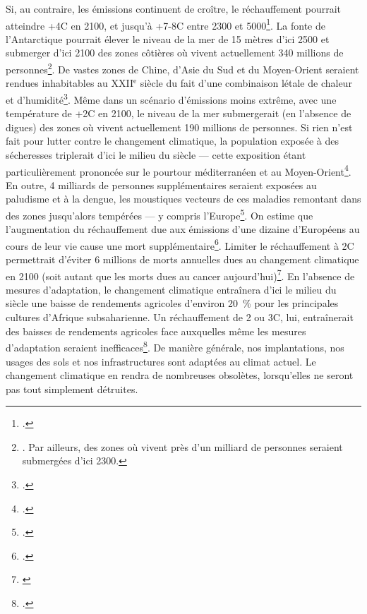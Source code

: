 \documentclass[a5paper,french,openany]{memoir}
\begin{document}
Si, au contraire, les émissions continuent de croître, le réchauffement pourrait atteindre +4\textdegree{}C en 2100, et jusqu'à +7-8\textdegree{}C entre 2300 et 5000\footnote{\citet{montenegro_long_2007}.}. La fonte de l'Antarctique pourrait élever le niveau de la mer de 15 mètres d'ici 2500 et submerger d'ici 2100 des zones côtières où vivent actuellement 340 millions de personnes\footnote{\cite{kulp_new_2019,deconto_contribution_2016,kopp_evolving_2017}. Par ailleurs, des zones où vivent près d'un milliard de personnes seraient submergées d'ici 2300.}. De vastes zones de Chine, d'Asie du Sud et du Moyen-Orient seraient rendues inhabitables au XXII$^\text{e}$ siècle du fait d'une combinaison létale de chaleur et d'humidité\footnote{\citet{pal_future_2016,im_deadly_2017,kang_north_2018}.}. Même dans un scénario d'émissions moins extrême, avec une température de +2\textdegree{}C en 2100, le niveau de la mer submergerait (en l'absence de digues) des zones où vivent actuellement 190 millions de personnes. %
Si rien n'est fait pour lutter contre le changement climatique, la population exposée à des sécheresses triplerait d'ici le milieu du siècle --- cette exposition étant particulièrement prononcée sur le pourtour méditerranéen et au Moyen-Orient\footnote{\cite{elliott_constraints_2014,marzi_assessing_2021}.}. En outre, 4 milliards de personnes supplémentaires seraient exposées au paludisme et à la dengue, les moustiques vecteurs de ces maladies remontant dans des zones jusqu'alors tempérées --- y compris l'Europe\footnote{\cite{colon-gonzalez_projecting_2021}.}. On estime que l'augmentation du réchauffement due aux émissions d'une dizaine d'Européens au cours de leur vie cause une mort supplémentaire\footnote{\cite{bressler_mortality_2021}.}. Limiter le réchauffement à 2\textdegree{}C permettrait d'éviter 6 millions de morts annuelles dues au changement climatique en 2100 (soit autant que les morts dues au cancer aujourd'hui)\footnote{\cite{carleton_valuing_2022}}. En l'absence de mesures d'adaptation, le changement climatique entraînera d'ici le milieu du siècle une baisse de rendements agricoles d'environ 20~\% pour les principales cultures d'Afrique subsaharienne. Un réchauffement de 2 ou 3\textdegree{}C, lui, entraînerait des baisses de rendements agricoles face auxquelles même les mesures d'adaptation seraient inefficaces\footnote{\cite{schlenker_robust_2010,moore_new_2017}.}. De manière générale, nos implantations, nos usages des sols et nos infrastructures sont adaptées au climat actuel. Le changement climatique en rendra de nombreuses obsolètes, lorsqu'elles ne seront pas tout simplement détruites. 
\end{document}
